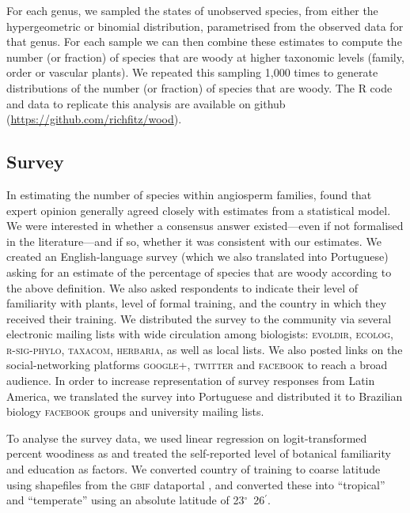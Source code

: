 For each genus, we sampled the states of unobserved species, from
either the hypergeometric or binomial distribution, parametrised from
the observed data for that genus.
%
For each sample we can then combine these estimates to compute the
number (or fraction) of species that are woody at higher taxonomic
levels (family, order or vascular plants).  We repeated this sampling
1,000 times to generate distributions of the number (or fraction) of
species that are woody.
%
The R code and data to replicate this analysis are available on github
(\url{https://github.com/richfitz/wood}).

\subsection{Survey}

In estimating the number of species within angiosperm families,
\citet{joppa2010} found that expert opinion generally agreed closely
with estimates from a statistical model.  We were interested in
whether a consensus answer existed---even if not formalised in the
literature---and if so, whether it was consistent with our
estimates.
% 
We created an English-language survey (which we also translated into
Portuguese) asking for an estimate of the percentage of species that
are woody according to the above definition.  We also asked
respondents to indicate their level of familiarity with plants, level
of formal training, and the country in which they received their
training. We distributed the survey to the 
community via several electronic
mailing lists with wide circulation among biologists: \textsc{evoldir},
\textsc{ecolog}, \textsc{\mbox{r-sig-phylo}}, \textsc{taxacom},
\textsc{herbaria}, as well as local lists. We also posted links on the
social-networking platforms \textsc{google+}, \textsc{twitter} and
\textsc{facebook} to reach a broad audience.
%
In order to increase representation of survey responses from Latin
America, we translated the survey into Portuguese and distributed it
to Brazilian biology \textsc{facebook} groups and university mailing
lists.

To analyse the survey data, we used linear regression on
logit-transformed percent woodiness as \citep[see][]{wartonarcsine}
and treated the self-reported level of botanical familiarity and
education as factors.  We converted country of training to coarse
latitude using shapefiles
from the \textsc{gbif} dataportal \citep{GBIFdata},
and converted these into ``tropical'' and ``temperate'' using an
absolute latitude of 23$^\circ$~26$^\prime$. 

